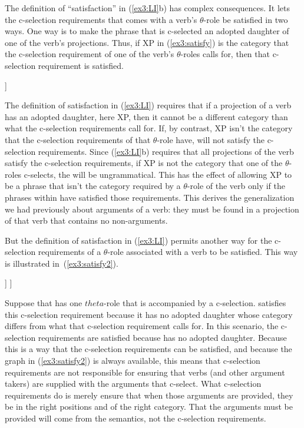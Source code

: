 The definition of ``satisfaction'' in (\ref{ex3:LI}b) has complex consequences. It lets the c-selection requirements that comes with a verb's $\theta$-role be satisfied in two ways. One way is to make the phrase that is c-selected an adopted daughter of one of the verb's projections. Thus, if XP in (\ref{ex3:satisfy}) is the category that the c-selection requirement of one of the verb's $\theta$-roles calls for, then that c-selection requirement is satisfied.
\begin{exe}
\raggedright
	\ex \label{ex3:satisfy}
	\begin{forest}
	[\ibar{V}
		[\obar{V} ]
		[XP ]
	]
	\end{forest}
\end{exe}
The definition of satisfaction in (\ref{ex3:LI}) requires that if a projection of a verb has an adopted daughter, here XP, then it cannot be a different category than what the c-selection requirements call for. If, by contrast, XP isn't the category that the c-selection requirements of that $\theta$-role have,  will not satisfy the c-selection requirements. Since (\ref{ex3:LI}b) requires that all projections of the verb satisfy the c-selection requirements, if XP is not the category that one of the $\theta$-roles c-selects, the  will be ungrammatical. This has the effect of allowing XP to be a phrase that isn't the category required by a $\theta$-role of the verb only if the phrases within  have satisfied those requirements. This derives the generalization we had previously about arguments of a verb: they must be found in a projection of that verb that contains no non-arguments.

But the definition of satisfaction in (\ref{ex3:LI}) permits another way for the c-selection requirements of a $\theta$-role associated with a verb to be satisfied. This way is illustrated in~(\ref{ex3:satisfy2}).
\begin{exe}
\raggedright
	\ex \label{ex3:satisfy2}
	\begin{forest}
	[\ibar{V}^*
		[\ibar{V} [\obar{V}] ]
	]
	\end{forest}
\end{exe}
Suppose that  has one $theta$-role that is accompanied by a c-selection.  satisfies this c-selection requirement because it has no adopted daughter whose category differs from what that c-selection requirement calls for. In this scenario, the c-selection requirements are satisfied because  has no adopted daughter. Because this is a way that the c-selection requirements can be satisfied, and because the graph in (\ref{ex3:satisfy2}) is always available, this means that c-selection requirements are not responsible for ensuring that verbs (and other argument takers) are supplied with the arguments that c-select. What c-selection requirements do is merely ensure that when those arguments are provided, they be in the right positions and of the right category. That the arguments must be provided will come from the semantics, not the c-selection requirements.

